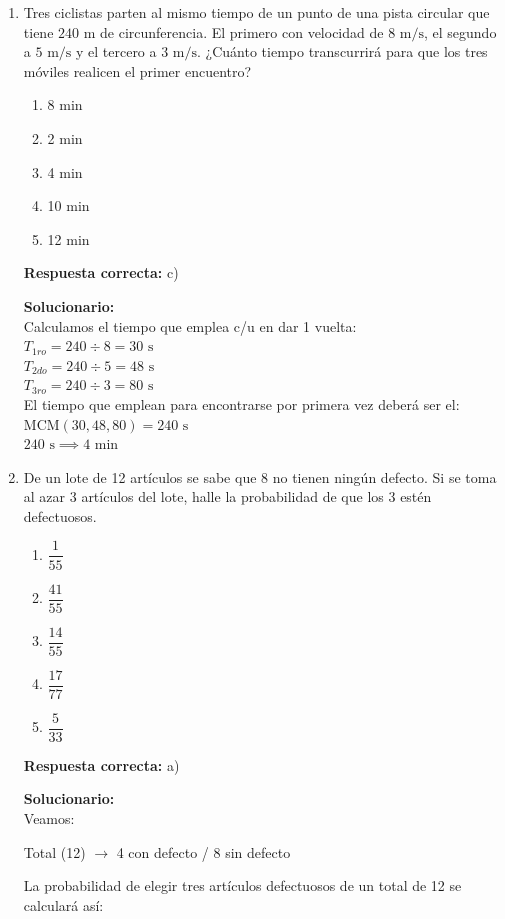 \begin{enumerate}
	\item Tres ciclistas parten al mismo tiempo de un punto de una pista circular que tiene $240\text{ m}$ de circunferencia. El primero con velocidad de $8\text{ m/s}$, el segundo a $5\text{ m/s}$ y el tercero a $3\text{ m/s}$. ¿Cuánto tiempo transcurrirá para que los tres móviles realicen el primer encuentro?
	\begin{enumerate}[label=\alph*)]
		\item 8 min
		\item 2 min
		\item 4 min
		\item 10 min
		\item 12 min
	\end{enumerate}
	\textbf{Respuesta correcta:} c)
	
	\vspace{2mm}
	\textbf{Solucionario:}\\
	Calculamos el tiempo que emplea c/u en dar 1 vuelta: \\
	$T_{1ro} = 240 \div 8 = 30\text{ s}$ \\
	$T_{2do} = 240 \div 5 = 48\text{ s}$ \\
	$T_{3ro} = 240 \div 3 = 80\text{ s}$ \\
	El tiempo que emplean para encontrarse por primera vez deberá ser el: \\
	$\text{MCM}(30, 48, 80) = 240\text{ s}$ \\
	$240\text{ s} \implies 4\text{ min}$
	
	\vspace{6mm}
	
	\item De un lote de 12 artículos se sabe que 8 no tienen ningún defecto. Si se toma al azar 3 artículos del lote, halle la probabilidad de que los 3 estén defectuosos.
	\begin{enumerate}[label=\alph*)]
		\item $\dfrac{1}{55}$
		\item $\dfrac{41}{55}$
		\item $\dfrac{14}{55}$
		\item $\dfrac{17}{77}$
		\item $\dfrac{5}{33}$
	\end{enumerate}
	\textbf{Respuesta correcta:} a)
	
	\vspace{2mm}
	\textbf{Solucionario:}\\
	Veamos:
	\begin{center}
		Total (12) $\rightarrow$ 4 con defecto / 8 sin defecto
	\end{center}
	La probabilidad de elegir tres artículos defectuosos de un total de 12 se calculará así: \\
	

\end{enumerate}
